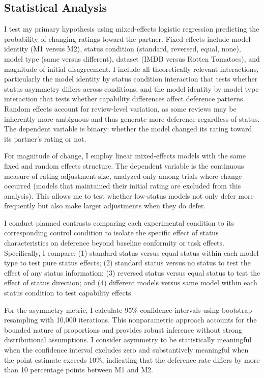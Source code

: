 \subsection{Statistical Analysis}

I test my primary hypothesis using mixed-effects logistic regression predicting the probability of changing ratings toward the partner. Fixed effects include model identity (M1 versus M2), status condition (standard, reversed, equal, none), model type (same versus different), dataset (IMDB versus Rotten Tomatoes), and magnitude of initial disagreement. I include all theoretically relevant interactions, particularly the model identity by status condition interaction that tests whether status asymmetry differs across conditions, and the model identity by model type interaction that tests whether capability differences affect deference patterns. Random effects account for review-level variation, as some reviews may be inherently more ambiguous and thus generate more deference regardless of status. The dependent variable is binary: whether the model changed its rating toward its partner's rating or not.

For magnitude of change, I employ linear mixed-effects models with the same fixed and random effects structure. The dependent variable is the continuous measure of rating adjustment size, analyzed only among trials where change occurred (models that maintained their initial rating are excluded from this analysis). This allows me to test whether low-status models not only defer more frequently but also make larger adjustments when they do defer.

I conduct planned contrasts comparing each experimental condition to its corresponding control condition to isolate the specific effect of status characteristics on deference beyond baseline conformity or task effects. Specifically, I compare: (1) standard status versus equal status within each model type to test pure status effects; (2) standard status versus no status to test the effect of any status information; (3) reversed status versus equal status to test the effect of status direction; and (4) different models versus same model within each status condition to test capability effects.

For the asymmetry metric, I calculate 95\% confidence intervals using bootstrap resampling with 10,000 iterations. This nonparametric approach accounts for the bounded nature of proportions and provides robust inference without strong distributional assumptions. I consider asymmetry to be statistically meaningful when the confidence interval excludes zero and substantively meaningful when the point estimate exceeds 10\%, indicating that the deference rate differs by more than 10 percentage points between M1 and M2.

